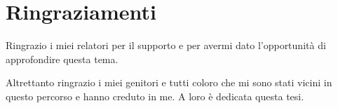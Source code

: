 \chapter*{Ringraziamenti}
Ringrazio i miei relatori per il supporto e per avermi dato l'opportunità di approfondire questa tema.

Altrettanto ringrazio i miei genitori e tutti coloro che mi sono stati vicini in questo percorso e hanno creduto in me. A loro è dedicata questa tesi.